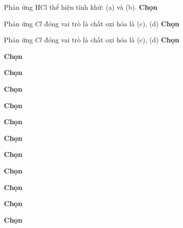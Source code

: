 \begin{loigiaiex}{29}
  Phản ứng $\mathrm {HCl}$ thể hiện tính khử: (a) và (b).  \phantom {a}\hfill {\bfseries \sffamily Chọn~} 
\end{loigiaiex}
\begin{loigiaiex}{31}
  Phản ứng $Cl$ đóng vai trò là chất oxi hóa là (c), (d)  \phantom {a}\hfill {\bfseries \sffamily Chọn~} 
\end{loigiaiex}
\begin{loigiaiex}{32}
  Phản ứng $Cl$ đóng vai trò là chất oxi hóa là (c), (d)  \phantom {a}\hfill {\bfseries \sffamily Chọn~} 
\end{loigiaiex}
\begin{loigiaiex}{33}
  \phantom {a}\hfill {\bfseries \sffamily Chọn~} 
\end{loigiaiex}
\begin{loigiaiex}{34}
  \phantom {a}\hfill {\bfseries \sffamily Chọn~} 
\end{loigiaiex}
\begin{loigiaiex}{35}
  \phantom {a}\hfill {\bfseries \sffamily Chọn~} 
\end{loigiaiex}
\begin{loigiaiex}{36}
  \phantom {a}\hfill {\bfseries \sffamily Chọn~} 
\end{loigiaiex}
\begin{loigiaiex}{37}
  \phantom {a}\hfill {\bfseries \sffamily Chọn~} 
\end{loigiaiex}
\begin{loigiaiex}{38}
  \phantom {a}\hfill {\bfseries \sffamily Chọn~} 
\end{loigiaiex}
\begin{loigiaiex}{39}
  \phantom {a}\hfill {\bfseries \sffamily Chọn~} 
\end{loigiaiex}
\begin{loigiaiex}{40}
  \phantom {a}\hfill {\bfseries \sffamily Chọn~} 
\end{loigiaiex}
\begin{loigiaiex}{41}
  \phantom {a}\hfill {\bfseries \sffamily Chọn~} 
\end{loigiaiex}
\begin{loigiaiex}{42}
  \phantom {a}\hfill {\bfseries \sffamily Chọn~} 
\end{loigiaiex}
\begin{loigiaiex}{43}
  \phantom {a}\hfill {\bfseries \sffamily Chọn~} 
\end{loigiaiex}
